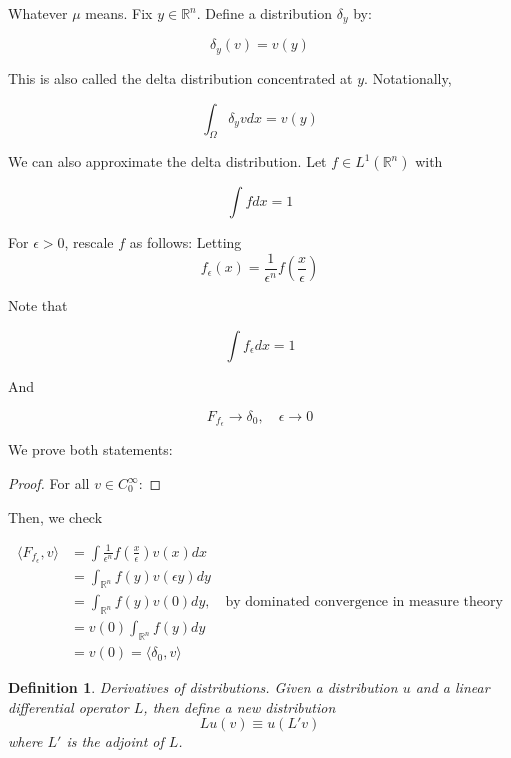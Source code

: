 \documentclass{article}
\newtheorem{definition}[theorem]{Definition}
\newtheorem{one minute paper}[theorem]{One Minute Paper}
\begin{document}
Whatever $\mu$ means. Fix $y \in \mathbb{R}^n$. Define a distribution $\delta_y$ by: 

\begin{equation}
    \delta_y(v) = v(y)
\end{equation}

This is also called the delta distribution concentrated at $y$. Notationally, 

\begin{equation}
    \int_\Omega\delta_y v dx = v(y)
\end{equation}

We can also approximate the delta distribution. Let $f \in  L^1(\mathbb{R}^n)$ with 

\begin{equation}
    \int f dx = 1
\end{equation}

For $\epsilon > 0$, rescale $f$ as follows: Letting $$f_{\epsilon}(x) = \frac{1}{\epsilon^{n}}f\left( \frac{x}{\epsilon} \right)$$

Note that 

\begin{equation}
    \int f_{\epsilon}dx = 1
\end{equation}

And 

\begin{equation}
    F_{f_{\epsilon}} \rightarrow \delta_0, \quad \epsilon \rightarrow 0
\end{equation}

We prove both statements:

\begin{proof}
    For all $v \in C_0^{\infty}$: 
\end{proof}

Then, we check 

\begin{align*}
    \langle F_{f_\epsilon}, v\rangle &= \int\frac{1}{\epsilon^n}f\left(\frac{x}{\epsilon}\right)v(x)dx \\
    &= \int_{\mathbb{R}^n}f(y)v(\epsilon y)dy\\
    &= \int_{\mathbb{R}^n}f(y)v(0) dy, \quad \text{by dominated convergence in measure theory} \\
    &= v(0)\int_{\mathbb{R}^n}f(y)dy \\
    &= v(0) = \langle \delta_0, v \rangle
\end{align*}

\begin{definition}
    Derivatives of distributions. Given a distribution $u$ and a linear differential operator $L$, then define a new distribution
    $$Lu(v) \equiv u(L' v)$$ where $L'$ is the adjoint of $L$.
\end{definition}
\end{document}

